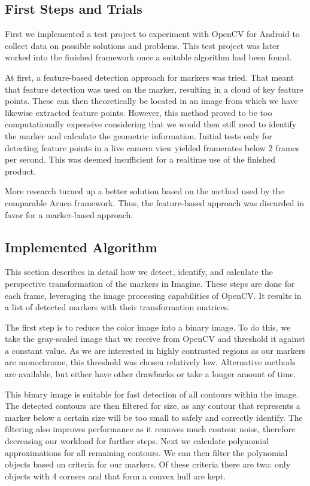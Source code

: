 \subsection{First Steps and Trials}

First we implemented a test project to experiment with OpenCV for Android to collect data on possible solutions and problems.
This test project was later worked into the finished framework once a suitable algorithm had been found.

At first, a feature-based detection approach for markers was tried.
That meant that feature detection was used on the marker, resulting in a cloud of key feature points.
These can then theoretically be located in an image from which we have likewise extracted feature points.
However, this method proved to be too computationally expensive considering that we would then still need to identify the marker and calculate the geometric information.
Initial tests only for detecting feature points in a live camera view yielded framerates below 2 frames per second.
This was deemed insufficient for a realtime use of the finished product.

More research turned up a better solution based on the method used by the comparable Aruco\cite{aruco} framework.
Thus, the feature-based approach was discarded in favor for a marker-based approach.

\subsection{Implemented Algorithm}
\label{detection_workflow}

This section describes in detail how we detect, identify, and calculate the perspective transformation of the markers in Imagine.
These steps are done for each frame, leveraging the image processing capabilities of OpenCV.
It results in a list of detected markers with their transformation matrices.

The first step is to reduce the color image into a binary image.
To do this, we take the gray-scaled image that we receive from OpenCV and threshold it against a constant value.
As we are interested in highly contrasted regions as our markers are monochrome, this threshold was chosen relatively low.
Alternative methods are available, but either have other drawbacks or take a longer amount of time.

This binary image is suitable for fast detection of all contours within the image.
The detected contours are then filtered for size, as any contour that represents a marker below a certain size will be too small to safely and correctly identify.
The filtering also improves performance as it removes much contour noise, therefore decreasing our workload for further steps.
Next we calculate polynomial approximations for all remaining contours.
We can then filter the polynomial objects based on criteria for our markers.
Of these criteria there are two: only objects with 4 corners and that form a convex hull are kept.

